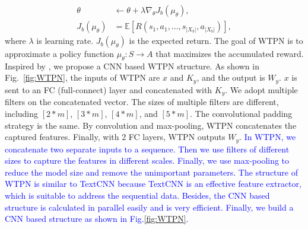 \begin{align}
\theta &\leftarrow \theta + \lambda \nabla_\theta J_b(\mu_\theta),\\
J_b(\mu_\theta) &= \mathbb{E} [R(s_1, a_1, ..., s_{|X_b|},a_{|X_b|}) ],
\end{align}
where $\lambda$ is learning rate. $J_b(\mu_\theta)$ is the expected return.
The goal of WTPN is to approximate a policy function $\mu_\theta :S \to A$ that maximizes the accumulated reward.  Inspired by \cite{DBLP:conf/aaai/KimJSR16}, we propose a CNN based WTPN structure. As shown in Fig.~\ref{fig:WTPN}, the inputs of WTPN are $x$ and $K_y$, and the output is $W_y$. $x$ is sent to an FC (full-connect) layer and concatenated with $K_y$. We adopt multiple filters on the concatenated vector. The sizes of multiple filters are different, including  $[2*m]$, $[3*m]$, $[4*m]$, and $[5*m]$. The convolutional padding strategy is the same. By convolution and max-pooling, WTPN concatenates the captured features. Finally, with 2 FC layers, WTPN outputs $W_y$. \textcolor{blue}{In WTPN, we concatenate two separate inputs to a sequence. Then we use filters of different sizes to capture the features in different scales. Finally, we use max-pooling to reduce the model size and remove the unimportant parameters. The structure of WTPN is similar to TextCNN because TextCNN is an effective feature extractor, which is suitable to address the sequential data. Besides, the CNN based structure is calculated in parallel easily and is very efficient. Finally, we build a CNN based structure as shown in Fig.\ref{fig:WTPN}.}